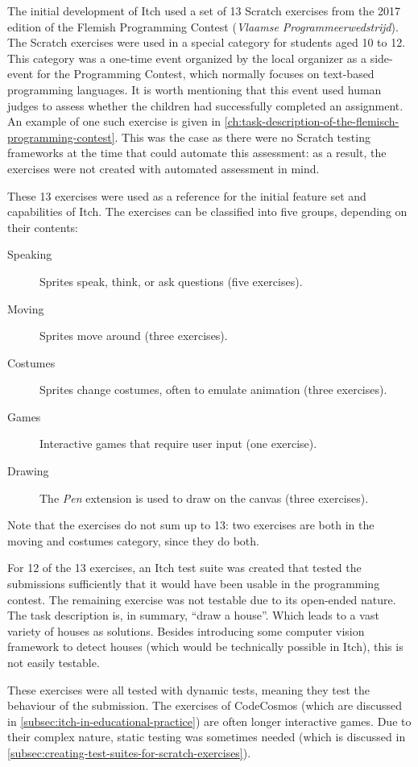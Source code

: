 \documentclass[../main]{subfiles}
\begin{document}
The initial development of Itch used a set of 13 Scratch exercises from the 2017 edition of the Flemish Programming Contest (\textdutch{\emph{Vlaamse Programmeerwedstrijd}}).
The Scratch exercises were used in a special category for students aged 10 to 12.
This category was a one-time event organized by the local organizer as a side-event for the Programming Contest, which normally focuses on text-based programming languages.
It is worth mentioning that this event used human judges to assess whether the children had successfully completed an assignment.
An example of one such exercise is given in \cref{ch:task-description-of-the-flemisch-programming-contest}.
This was the case as there were no Scratch testing frameworks at the time that could automate this assessment: as a result, the exercises were not created with automated assessment in mind.

These 13 exercises were used as a reference for the initial feature set and capabilities of Itch.
The exercises can be classified into five groups, depending on their contents:

\begin{description}
    \item[Speaking] Sprites speak, think, or ask questions (five exercises).
    \item[Moving] Sprites move around (three exercises).
    \item[Costumes] Sprites change costumes, often to emulate animation (three exercises).
    \item[Games] Interactive games that require user input (one exercise).
    \item[Drawing] The \emph{Pen} extension is used to draw on the canvas (three exercises).
\end{description}

Note that the exercises do not sum up to 13: two exercises are both in the moving and costumes category, since they do both.

For 12 of the 13 exercises, an Itch test suite was created that tested the submissions sufficiently that it would have been usable in the programming contest.
The remaining exercise was not testable due to its open-ended nature.
The task description is, in summary, ``draw a house''.
Which leads to a vast variety of houses as solutions.
Besides introducing some computer vision framework to detect houses (which would be technically possible in Itch), this is not easily testable.

These exercises were all tested with dynamic tests, meaning they test the behaviour of the submission.
The exercises of CodeCosmos (which are discussed in \cref{subsec:itch-in-educational-practice}) are often longer interactive games.
Due to their complex nature, static testing was sometimes needed (which is discussed in \cref{subsec:creating-test-suites-for-scratch-exercises}).
\end{document}
